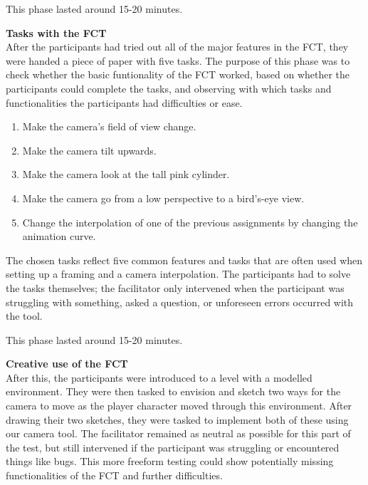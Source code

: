 This phase lasted around 15-20 minutes.

\textbf{Tasks with the FCT}\\
After the participants had tried out all of the major features in the FCT, they were handed a piece of paper with five tasks. The purpose of this phase was to check whether the basic funtionality of the FCT worked, based on whether the participants could complete the tasks, and observing with which tasks and functionalities the participants had difficulties or ease.


\begin{enumerate}
\item Make the camera's field of view change.
\item Make the camera tilt upwards.
\item Make the camera look at the tall pink cylinder.
\item Make the camera go from a low perspective to a bird's-eye view.
\item Change the interpolation of one of the previous assignments by changing the animation curve.
\end{enumerate} 

The chosen tasks reflect five common features and tasks that are often used when setting up a framing and a camera interpolation. The participants had to solve the tasks themselves; the facilitator only intervened when the participant was struggling with something, asked a question, or unforeseen errors occurred with the tool.

This phase lasted around 15-20 minutes.

\textbf{Creative use of the FCT}\\
After this, the participants were introduced to a level with a modelled environment. They were then tasked to envision and sketch two ways for the camera to move as the player character moved through this environment. After drawing their two sketches, they were tasked to implement both of these using our camera tool. The facilitator remained as neutral as possible for this part of the test, but still intervened if the participant was struggling or encountered things like bugs. This more freeform testing could show potentially missing functionalities of the FCT and further difficulties.


